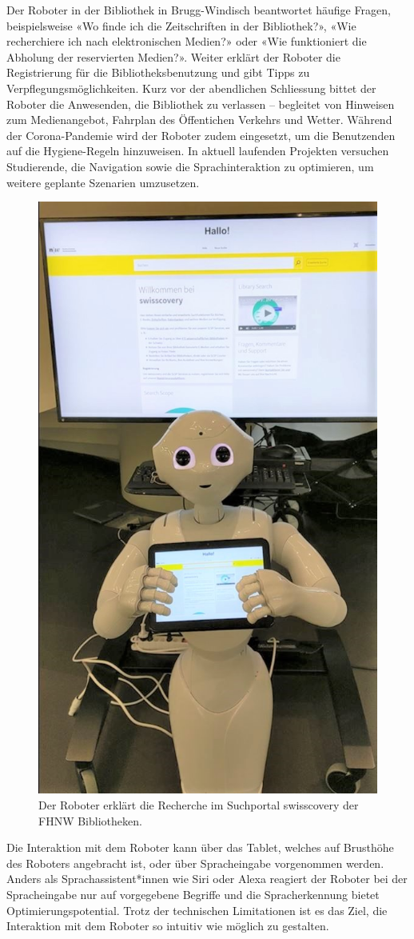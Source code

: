 \documentclass[a4paper,
fontsize=11pt,
oneside,
numbers=noperiodatend,
parskip=half-,
bibliography=totoc,
final
]{scrartcl}
\begin{document}
Der Roboter in der Bibliothek in Brugg-Windisch beantwortet häufige
Fragen, beispielsweise «Wo finde ich die Zeitschriften in der
Bibliothek?», «Wie recherchiere ich nach elektronischen Medien?» oder
«Wie funktioniert die Abholung der reservierten Medien?». Weiter erklärt
der Roboter die Registrierung für die Bibliotheksbenutzung und gibt
Tipps zu Verpflegungsmöglichkeiten. Kurz vor der abendlichen Schliessung
bittet der Roboter die Anwesenden, die Bibliothek zu verlassen --
begleitet von Hinweisen zum Medienangebot, Fahrplan des Öffentichen
Verkehrs und Wetter. Während der Corona-Pandemie wird der Roboter zudem
eingesetzt, um die Benutzenden auf die Hygiene-Regeln hinzuweisen. In
aktuell laufenden Projekten versuchen Studierende, die Navigation sowie
die Sprachinteraktion zu optimieren, um weitere geplante Szenarien
umzusetzen.

\begin{figure}
\centering
\includegraphics[width=.5\textwidth]{img/Schulungen_swisscovery1.jpg}
\caption{Der Roboter erklärt die Recherche im Suchportal
swisscovery der FHNW Bibliotheken.}
\end{figure}

Die Interaktion mit dem Roboter kann über das Tablet, welches auf
Brusthöhe des Roboters angebracht ist, oder über Spracheingabe
vorgenommen werden. Anders als Sprachassistent*innen wie Siri oder Alexa
reagiert der Roboter bei der Spracheingabe nur auf vorgegebene Begriffe
und die Spracherkennung bietet Optimierungspotential. Trotz der
technischen Limitationen ist es das Ziel, die Interaktion mit dem
Roboter so intuitiv wie möglich zu gestalten.
\end{document}

